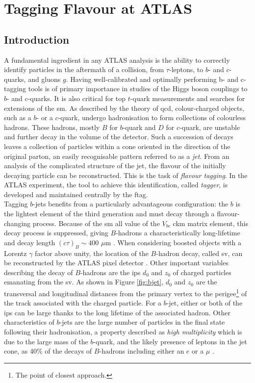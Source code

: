 \section{Tagging Flavour at ATLAS}
\subsection{Introduction}
A fundamental ingredient in any ATLAS analysis is the ability to correctly identify particles in the aftermath of a collision, from $\tau$-leptons, to $b$- and $c$-quarks, and gluons $g$. Having well-calibrated and optimally performing b- and c-tagging tools is of primary importance in studies of the Higgs boson couplings to $b$- and $c$-quarks. It is also critical for top $t$-quark measurements and searches for extensions of the \gls{sm}. As described by the theory of \gls{qcd}, colour-charged objects, such as a $b$- or a $c$-quark, undergo hadronisation to form collections of colourless hadrons. These hadrons, mostly $B$ for $b$-quark and $D$ for $c$-quark, are unstable and further decay in the volume of the detector. Such a succession of decays leaves a collection of particles within a cone oriented in the direction of the original parton, an easily recognisable pattern referred to as a \textit{jet}. From an analysis of the complicated structure of the jet, the flavour of the initially decaying particle can be reconstructed. This is the task of \textit{flavour tagging}. In the ATLAS experiment, the tool to achieve this identification, called \textit{tagger}, is developed and maintained centrally by the \gls{ftag}. \\

Tagging $b$-jets benefits from a particularly advantageous configuration:  the $b$ is the lightest element of the third generation and must decay through a flavour-changing process. Because of the \gls{sm} all value of the $V_{bc}$ \gls{ckm} matrix element, this decay process is suppressed, giving $B$-hadrons a characteristically long-lifetime and decay length $(c\tau)_{B} \sim 400$  $\mu$m \cite{Tanabashi:2018oca}. When considering boosted objects with a Lorentz $\gamma$ factor above unity, the location of the $B$-hadron decay, called  \gls{sv}, can be reconstructed by the ATLAS pixel detector \cite{Aad:2019aic}. Other important variables describing the decay of $B$-hadrons are the \glspl{ip} $d_0$ and $z_0$ of charged particles emanating from the \gls{sv}. As shown in Figure \ref{fig:bjet}, $d_0$ and $z_0$ are the transversal and longitudinal distances from the primary vertex to the perigee\footnote{The point of closest approach.} of the track associated with the charged particle. For a $b$-jet, either or both of the \glspl{ip} can be large thanks to the long lifetime of the associated hadron. Other characteristics of $b$-jets are the large number of particles in the final state following their hadronisation, a property described as \textit{high multiplicity} which is due to the large mass of the $b$-quark, and the likely presence of leptons in the jet cone, as 40\% of the decays of $B$-hadrons including either an $e$ or a $\mu$ \cite{Tanabashi:2018oca}. \\

